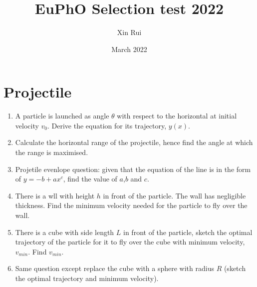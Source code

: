 \documentclass{scrartcl}
\begin{document}
\title{EuPhO Selection test 2022}
\author{Xin Rui}
\date{March 2022}
\setlength\parindent{0pt}

\maketitle


\section{Projectile}

\begin{enumerate}

      \item A particle is launched as angle $\theta$ with respect to the horizontal at initial velocity $v_0$. Derive the  equation for its trajectory, $y(x)$.
      \item Calculate the horizontal range of the projectile, hence find the angle at which the range is maximised.
      \item Projetile evenlope question: given that the equation of the line is  in the form of $y=-b+ax^c$, find the value of $a$,$b$ and $c$.
      \item There is a wll with height $h$ in front of the particle. The wall has negligible thickness. Find the minimum velocity needed for the particle to fly over the wall.
      \item There is a cube with side length $L$ in front of the particle, sketch the optimal trajectory of the particle for it to fly over the cube with minimum velocity, $v_{min}$. Find $v_{min}$.
      \item Same question except replace the cube with a sphere with radius $R$ (sketch the optimal trajectory and minimum velocity).

\end{enumerate}
\end{document}
